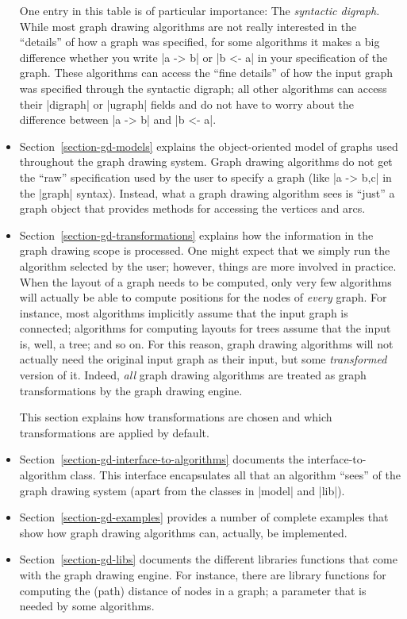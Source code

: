 \begin{itemize}
        One entry in this table is of particular importance: The
        \emph{syntactic digraph.} While most graph drawing algorithms are not
        really interested in the ``details'' of how a graph was specified, for
        some algorithms it makes a big difference whether you write |a -> b| or
        |b <- a| in your specification of the graph. These algorithms can
        access the ``fine details'' of how the input graph was specified
        through the syntactic digraph; all other algorithms can access their
        |digraph| or |ugraph| fields and do not have to worry about the
        difference between |a -> b| and |b <- a|.
    \item Section~\ref{section-gd-models} explains the object-oriented model of
        graphs used throughout the graph drawing system. Graph drawing
        algorithms do not get the ``raw'' specification used by the user to
        specify a graph (like |{a -> {b,c}}| in the |graph| syntax). Instead,
        what a graph drawing algorithm sees is ``just'' a graph object that
        provides methods for accessing the vertices and arcs.
    \item Section~\ref{section-gd-transformations} explains how the information
        in the graph drawing scope is processed. One might expect that we
        simply run the algorithm selected by the user; however, things are more
        involved in practice. When the layout of a graph needs to be computed,
        only very few algorithms will actually be able to compute positions for
        the nodes of \emph{every} graph. For instance, most algorithms
        implicitly assume that the input graph is connected; algorithms for
        computing layouts for trees assume that the input is, well, a tree; and
        so on. For this reason, graph drawing algorithms will not actually need
        the original input graph as their input, but some \emph{transformed}
        version of it. Indeed, \emph{all} graph drawing algorithms are treated
        as graph transformations by the graph drawing engine.

        This section explains how transformations are chosen and which
        transformations are applied by default.
    \item Section~\ref{section-gd-interface-to-algorithms} documents the
        interface-to-algorithm class. This interface encapsulates all that an
        algorithm ``sees'' of the graph drawing system (apart from the classes
        in |model| and |lib|).
    \item Section~\ref{section-gd-examples} provides a number of complete
        examples that show how graph drawing algorithms can, actually, be
        implemented.
    \item Section~\ref{section-gd-libs} documents the different libraries
        functions that come with the graph drawing engine. For instance, there
        are library functions for computing the (path) distance of nodes in a
        graph; a parameter that is needed by some algorithms.
\end{itemize}


